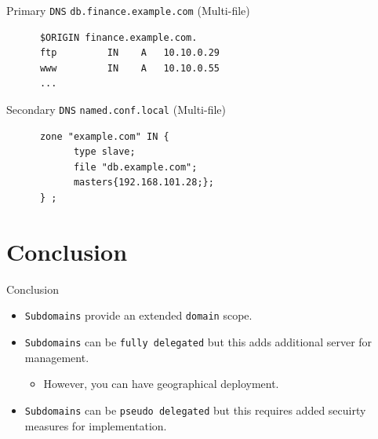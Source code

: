 \documentclass[xcolor=table,aspectratio=169]{beamer}
\begin{document}
\begin{frame}[fragile]{Primary \texttt{DNS} \texttt{db.finance.example.com} (Multi-file)}
  \begin{tcolorbox}
    \lstset{
      basicstyle=\tiny\ttfamily,
    }
    \begin{lstlisting}
      $ORIGIN finance.example.com.
      ftp 		  IN    A   10.10.0.29
      www		  IN    A   10.10.0.55
      ...
    \end{lstlisting}
  \end{tcolorbox}
\end{frame}

\begin{frame}[fragile]{Secondary \texttt{DNS} \texttt{named.conf.local} (Multi-file)}
  \begin{tcolorbox}
    \lstset{
      basicstyle=\tiny\ttfamily,
    }
    \begin{lstlisting}
      zone "example.com" IN {
	        type slave;
	        file "db.example.com";
	        masters{192.168.101.28;};
      } ;
    \end{lstlisting}
  \end{tcolorbox}
\end{frame}


\section*{Conclusion}
\begin{frame}{Conclusion}
  \begin{itemize}
    \item \texttt{Subdomains} provide an extended \texttt{domain} scope.
    \item \texttt{Subdomains} can be \texttt{fully delegated} but this adds additional server for management.
      \begin{itemize}
        \item However, you can have geographical deployment.
      \end{itemize}
    \item \texttt{Subdomains} can be \texttt{pseudo delegated} but this requires added secuirty measures for implementation.
  \end{itemize}
\end{frame}
\end{document}
